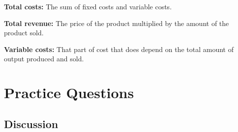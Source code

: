 \documentclass[
]{book}
\begin{document}
\textbf{Total costs:} The sum of fixed costs and variable costs.

\textbf{Total revenue:} The price of the product multiplied by the amount of the product sold.

\textbf{Variable costs:} That part of cost that does depend on the total amount of output produced and sold.

\hypertarget{practice-questions-5}{%
\section{Practice Questions}\label{practice-questions-5}}

\hypertarget{discussion-5}{%
\subsection{Discussion}\label{discussion-5}}
\end{document}
